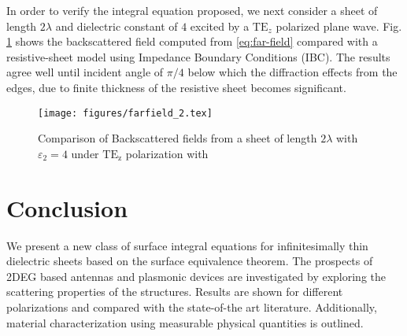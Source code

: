 \documentclass[conference, 10pt]{IEEEtran}
\newcommand{\E}{\varepsilon}  %
\renewcommand{\^}{\hat}  %
\begin{document}
 In order to verify the integral equation proposed, we next consider a sheet of length $2 \lambda$ and dielectric constant of $4$ excited by a $\mathrm{TE}_z$ polarized plane wave. Fig. \ref{fig:rcs} shows the backscattered field computed from \eqref{eq:far-field} compared with a resistive-sheet model \cite{senior1987sheet} using Impedance Boundary Conditions (IBC). The results agree well until incident angle of $\pi/4$ below which the diffraction effects from the edges, due to finite thickness of the resistive sheet becomes significant.
%
\begin{figure}[h]
  \begin{center}
    \noindent
    \texttt{[image: figures/farfield\_2.tex]}
    \caption{Comparison of Backscattered fields from a sheet of length $2\lambda$ with $\E_2 = 4$ under $\mathrm{TE_z}$ polarization with \cite{senior1987sheet}}
    \label{fig:rcs}
  \end{center}
\end{figure}
%   
\section{Conclusion}
%
We present a new class of surface integral equations for infinitesimally thin dielectric sheets based on the surface equivalence theorem. The prospects of 2DEG based antennas and plasmonic devices are investigated by exploring the scattering properties of the structures. Results are shown for different polarizations and compared with the state-of-the art literature. Additionally, material characterization using measurable physical quantities is outlined.
%


\end{document}
